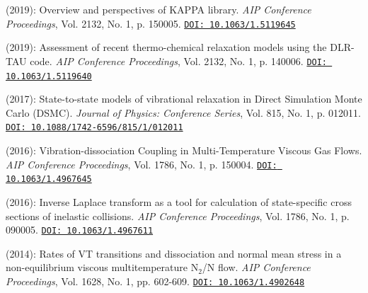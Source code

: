 \begin{enumerate}
 (2019): Overview and perspectives of KAPPA library. \textit{AIP Conference Proceedings}, Vol. 2132, No. 1, p. 150005.
\newline
    \href{https://doi.org/10.1063/1.5119645}{\texttt{DOI: 10.1063/1.5119645}}

 (2019): Assessment of recent thermo-chemical relaxation models using the DLR-TAU code. \textit{AIP Conference Proceedings}, Vol. 2132, No. 1, p. 140006.\newline
    \href{https://doi.org/10.1063/1.5119640}{\texttt{DOI: 10.1063/1.5119640}}

 (2017): State-to-state models of vibrational relaxation in Direct Simulation Monte Carlo (DSMC). \textit{Journal of Physics: Conference Series}, Vol. 815, No. 1, p. 012011.\newline
    \href{https://doi.org/10.1088/1742-6596/815/1/012011}{\texttt{DOI: 10.1088/1742-6596/815/1/012011}}

 (2016): Vibration-dissociation Coupling in Multi-Temperature Viscous Gas Flows. \textit{AIP Conference Proceedings}, Vol. 1786, No. 1, p. 150004.
\newline
    \href{https://doi.org/10.1063/1.4967645}{\texttt{DOI: 10.1063/1.4967645}}

 (2016): Inverse Laplace transform as a tool for calculation of state-specific cross sections of inelastic collisions. \textit{AIP Conference Proceedings}, Vol. 1786, No. 1, p. 090005.\newline
    \href{https://doi.org/10.1063/1.4967611}{\texttt{DOI: 10.1063/1.4967611}}

 (2014): Rates of VT transitions and dissociation and normal mean stress in a non-equilibrium viscous multitemperature N$_2$/N flow. \textit{AIP Conference Proceedings}, Vol. 1628, No. 1, pp. 602-609.\newline
    \href{https://doi.org/10.1063/1.4902648}{\texttt{DOI: 10.1063/1.4902648}}

\end{enumerate}
